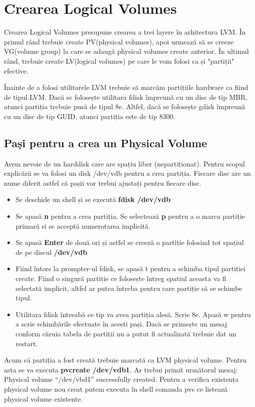 \section{Crearea Logical Volumes}
Crearea Logical Volumes presupune crearea a trei layere în arhitectura LVM. În primul rând trebuie create PV(physical volumes), apoi urmează să se creeze VG(volume group) la care se adaugă physical volumes create anterior. În ultimul rând, trebuie create LV(logical volumes) pe care le vom folosi ca și "partiții" efective.
\par
Înainte de a folosi utilitarele LVM trebuie să marcăm partițiile hardware ca fiind de tipul LVM. Dacă se folosește utilitara fdisk împreună cu un disc de tip MBR, atunci partiția trebuie pusă de tipul 8e. Altfel, dacă se folosește gdisk împreună cu un disc de tip GUID, atunci partiția este de tip 8300.
\subsection{Pași pentru a crea un Physical Volume}
Avem nevoie de un harddisk care are spațiu liber (nepartiționat). Pentru scopul explicării se va folosi un disk /dev/vdb pentru a crea partiția. Fiecare disc are un nume diferit astfel că pașii vor trebui ajustați pentru fiecare disc.
\begin{itemize}
\item Se deschide un shell și se execută \textbf{fdisk /dev/vdb}
\item Se apasă \textbf{n} pentru a crea partiția. Se selectează \textbf{p} pentru a o marca partiție primară si se acceptă numerotarea implicită.
\item Se apasă \textbf{Enter} de două ori și astfel se creeză o partiție folosind tot spațiul de pe discul \textbf{/dev/vdb}
\item Fiind întors la prompter-ul fdisk, se apasă t pentru a schimba tipul partiției create. Fiind o singură partiție ce folosește întreg spatiul aceasta va fi selectată implicit, altfel ar putea întreba pentru care partiție să se schimbe tipul. 
\item Utilitara fdisk întreabă ce tip va avea partiția alesă. Scrie 8e. Apasă w pentru a scrie schimbările efectuate în acești pași. Dacă se primește un mesaj conform căruia tabela de partiții nu a putut fi actualizată trebuie dat un restart. 
\end{itemize}
Acum că partiția a fost creată trebuie marcată ca LVM physical volume. Pentru asta se va executa \textbf{pvcreate /dev/vdb1}. Ar trebui primit următorul mesaj: Physical volume “/dev/vbd1” successfully created. Pentru a verifica existența physical volume nou creat putem executa în shell comanda pvs ce listează physical volume existente.
